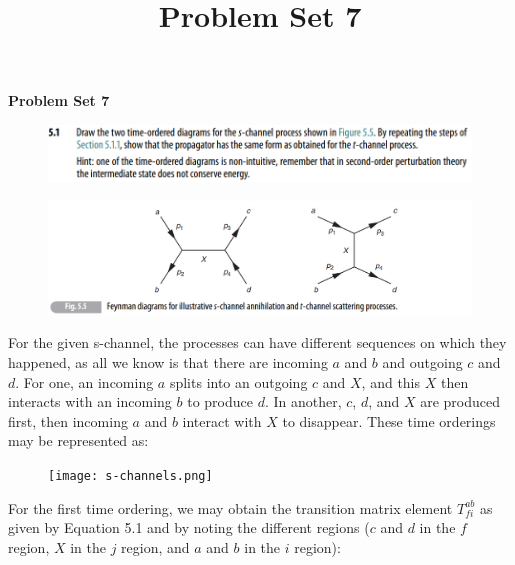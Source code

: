 \documentclass[11pt]{article}
\theoremstyle{definition}
\begin{document}
\setcounter{section}{2}
\title{Problem Set 7}

\pagestyle{fancy}
\fancyhf{}

\begin{center}
{\LARGE \bf Problem Set 7}\\
\end{center}

\begin{figure}[H]
    \centering
    \includegraphics[scale = 0.5]{5.1.png}
\end{figure}
\begin{figure}[H]
    \centering
    \includegraphics[scale = 0.5]{fig 5.5.png}
\end{figure}

For the given s-channel, the processes can have different sequences on which they happened, as all we know is that there are incoming $a$ and $b$ and outgoing $c$ and $d$. For one, an incoming $a$ splits into an outgoing $c$ and $X$, and this $X$ then interacts with an incoming $b$ to produce $d$. In another, $c$, $d$, and $X$ are produced first, then incoming $a$ and $b$ interact with $X$ to disappear. These time orderings may be represented as:

\begin{figure}[H]
    \centering
    \texttt{[image: s-channels.png]}
\end{figure}

For the first time ordering, we may obtain the transition matrix element $T_{fi}^{ab}$ as given by Equation 5.1 and by noting the different regions ($c$ and $d$ in the $f$ region, $X$ in the $j$ region, and $a$ and $b$ in the $i$ region):
\end{document}
